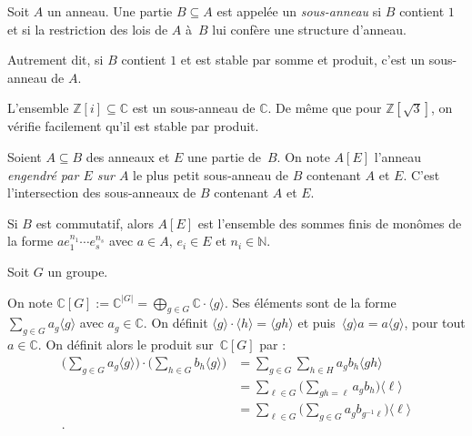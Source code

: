\documentclass[./main]{subfiles}
\begin{document}
  \begin{defn}
    Soit $A$ un anneau.
    Une partie $B \subseteq A$ est appelée un \textit{sous-anneau} si $B$ contient $1$ et si la restriction des lois de $A$ à~$B$ lui confère une structure d'anneau.

    Autrement dit, si $B$ contient $1$ et est stable par somme et produit, c'est un sous-anneau de $A$.
  \end{defn}

  \begin{exm}
    L'ensemble $\mathds{Z}[i] \subseteq \mathds{C}$  est un sous-anneau de $\mathds{C}$. De même que pour $\mathds{Z}[\sqrt{3}]$, on vérifie facilement qu'il est stable par produit.
  \end{exm}

  \begin{defn}
    Soient $A \subseteq B$ des anneaux et $E$ une partie de~$B$.
    On note $A[E]$ l'anneau \textit{engendré par $E$ sur $A$} le plus petit sous-anneau de $B$ contenant $A$ et $E$. C'est l'intersection des sous-anneaux de $B$ contenant $A$ et $E$.
  \end{defn}

  \begin{rmk}
    Si $B$ est commutatif, alors $A[E]$ est l'ensemble des sommes finis de monômes de la forme $a e_1^{n_1} \cdots e_s^{n_s}$ avec $a \in A$, $e_i \in E$ et $n_i \in \mathds{N}$.
  \end{rmk}

  \begin{exm}
    Soit $G$ un groupe.

    On note $\mathds{C}[G] := \mathds{C}^{|G|} = \bigoplus_{g \in G} \mathds{C} \cdot \langle g \rangle$.
    Ses éléments sont de la forme $\sum_{g \in G} a_g \langle g\rangle$ avec $a_g \in \mathds{C}$.
    On définit $\langle g \rangle \cdot \langle h \rangle = \langle g h \rangle$ et puis~$\langle g \rangle a = a \langle g \rangle$, pour tout  $a \in \mathds{C}$.
    On définit alors le produit sur~$\mathds{C}[G]$ par :
    \begin{align*}
    \Big(\sum_{g \in G} a_g \langle g \rangle\Big) \cdot 
    \Big(\sum_{h \in G} b_h \langle g \rangle\Big)
    &= \sum_{g \in G} \sum_{h \in H} a_g b_h \langle gh \rangle\\
    &= \sum_{\ell \in G} \Big(\sum_{gh = \ell} a_g b_h\Big) \langle \ell \rangle \\
    &= \sum_{\ell \in G} \Big( \sum_{g \in G} a_g b_{g^{-1} \ell}\Big) \langle \ell \rangle\\
    .\end{align*}
  \end{exm}
\end{document}
